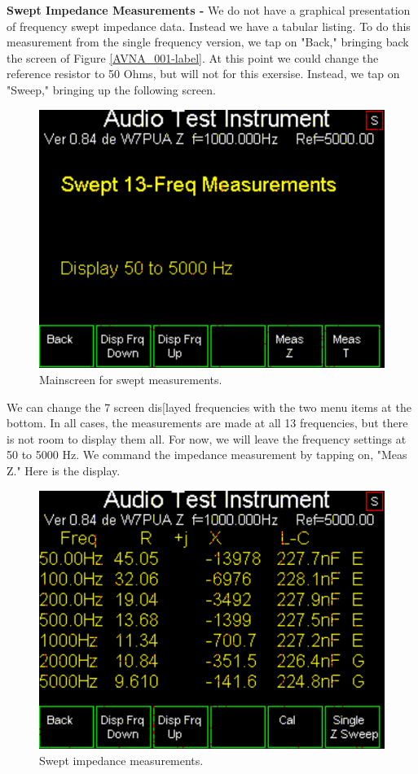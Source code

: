 \textbf{Swept Impedance Measurements - }  We do not have a graphical presentation of frequency swept impedance data.  Instead we have a tabular listing.
To do this measurement from the single frequency version, we tap on "Back," bringing back the screen of Figure \ref{AVNA_001-label}.
At this point we could change the reference resistor to 50 Ohms, but will not for this exersise.
Instead, we tap on "Sweep," bringing up the following screen.
\begin{figure}[H]
\begin{center}
\includegraphics[scale=0.75]{./images/AVNA_007.pdf}
\caption{Mainscreen for swept measurements.}
\label{AVNA_007-label}
\end{center}
\end{figure}
We can change the 7 screen dis[layed frequencies with the two menu items at the bottom.  In all cases, the measurements are made at all 13 frequencies, but there is not room to display them all.  For now, we will leave the frequency settings at 50 to 5000 Hz.  We command the impedance measurement by tapping on, "Meas Z."  Here is the display.
\begin{figure}[H]
\begin{center}
\includegraphics[scale=0.75]{./images/AVNA_009.pdf}
\caption{Swept impedance measurements.}
\label{AVNA_009-label}
\end{center}
\end{figure}
